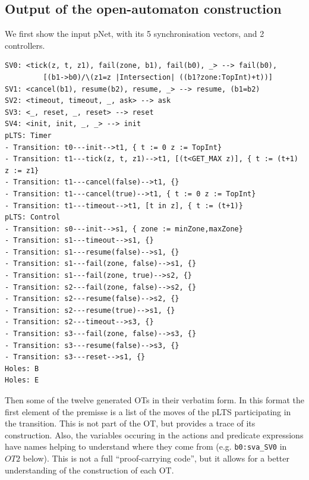 \documentclass{llncs}
\makeatletter
\newcommand{\verbatimfont}[1]{\renewcommand{\verbatim@font}{\ttfamily#1}}
\makeatother
\begin{document}
\subsection{Output of the open-automaton construction}
\label{secn:full-results}



We first show the input pNet, with its 5 synchronisation vectors, and 2 controllers.

\bigskip
\noindent
\verbatimfont{\small}
\begin{verbatim}
SV0: <tick(z, t, z1), fail(zone, b1), fail(b0), _> --> fail(b0),
         [(b1->b0)/\(z1=z |Intersection| ((b1?zone:TopInt)+t))]
SV1: <cancel(b1), resume(b2), resume, _> --> resume, (b1=b2)
SV2: <timeout, timeout, _, ask> --> ask
SV3: <_, reset, _, reset> --> reset
SV4: <init, init, _, _> --> init
pLTS: Timer
- Transition: t0---init-->t1, { t := 0 z := TopInt}
- Transition: t1---tick(z, t, z1)-->t1, [(t<GET_MAX z)], { t := (t+1) z := z1}
- Transition: t1---cancel(false)-->t1, {}
- Transition: t1---cancel(true)-->t1, { t := 0 z := TopInt}
- Transition: t1---timeout-->t1, [t in z], { t := (t+1)}
pLTS: Control
- Transition: s0---init-->s1, { zone := minZone,maxZone}
- Transition: s1---timeout-->s1, {}
- Transition: s1---resume(false)-->s1, {}
- Transition: s1---fail(zone, false)-->s1, {}
- Transition: s1---fail(zone, true)-->s2, {}
- Transition: s2---fail(zone, false)-->s2, {}
- Transition: s2---resume(false)-->s2, {}
- Transition: s2---resume(true)-->s1, {}
- Transition: s2---timeout-->s3, {}
- Transition: s3---fail(zone, false)-->s3, {}
- Transition: s3---resume(false)-->s3, {}
- Transition: s3---reset-->s1, {}
Holes: B
Holes: E
\end{verbatim}
\bigskip

Then some of the twelve generated OTs in their verbatim form. In this format
the first element of the premisse is a list of the moves of the pLTS
participating in the transition. This is not part of the OT, but
provides a trace of its construction. Also, the variables occuring in
the actions and predicate expressions have names helping to understand
where they come from (e.g. \verb|b0:sva_SV0| in $OT2$ below).
This is not a full ``proof-carrying
code'', but it allows for a better understanding of the construction
of each OT.
\end{document}
